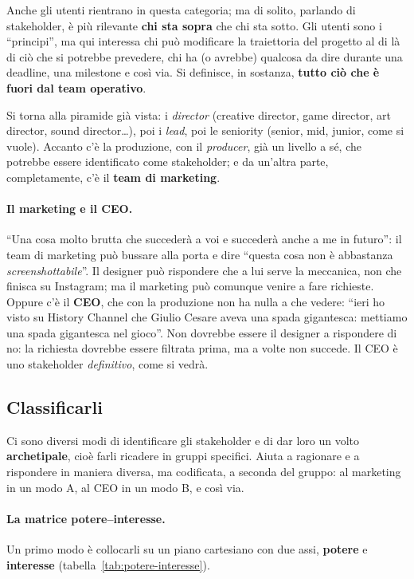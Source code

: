 Anche gli utenti rientrano in questa categoria; ma di solito, parlando di
stakeholder, è più rilevante \textbf{chi sta sopra} che chi sta sotto. Gli
utenti sono i ``principi'', ma qui interessa chi può modificare la
traiettoria del progetto al di là di ciò che si potrebbe prevedere, chi ha (o
avrebbe) qualcosa da dire durante una deadline, una milestone e così via. Si
definisce, in sostanza, \textbf{tutto ciò che è fuori dal team operativo}.

Si torna alla piramide già vista: i \emph{director} (creative director, game
director, art director, sound director\dots), poi i \emph{lead}, poi le
seniority (senior, mid, junior, come si vuole). Accanto c'è la produzione, con
il \emph{producer}, già un livello a sé, che potrebbe essere identificato come
stakeholder; e da un'altra parte, completamente, c'è il \textbf{team di
marketing}.

\paragraph{Il marketing e il CEO.} ``Una cosa molto brutta che succederà a voi
e succederà anche a me in futuro'': il team di marketing può bussare alla
porta e dire ``questa cosa non è abbastanza \emph{screenshottabile}''. Il
designer può rispondere che a lui serve la meccanica, non che finisca su
Instagram; ma il marketing può comunque venire a fare richieste. Oppure c'è il
\textbf{CEO}, che con la produzione non ha nulla a che vedere: ``ieri ho visto
su History Channel che Giulio Cesare aveva una spada gigantesca: mettiamo una
spada gigantesca nel gioco''. Non dovrebbe essere il designer a rispondere di
no: la richiesta dovrebbe essere filtrata prima, ma a volte non succede. Il CEO
è uno stakeholder \emph{definitivo}, come si vedrà.

\subsection{Classificarli}

Ci sono diversi modi di identificare gli stakeholder e di dar loro un volto
\textbf{archetipale}, cioè farli ricadere in gruppi specifici. Aiuta a
ragionare e a rispondere in maniera diversa, ma codificata, a seconda del
gruppo: al marketing in un modo A, al CEO in un modo B, e così via.

\paragraph{La matrice potere--interesse.} Un primo modo è collocarli su un
piano cartesiano con due assi, \textbf{potere} e \textbf{interesse}
(tabella~\ref{tab:potere-interesse}).

